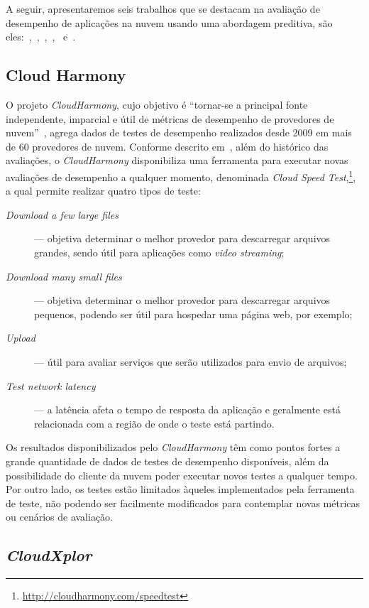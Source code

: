 A seguir, apresentaremos seis trabalhos que se destacam na avaliação de
desempenho de aplicações na nuvem usando uma abordagem preditiva, são
eles:~\cite{cloudharmony},~\cite{malkowski2010cloudxplor},~\cite{li2011},~\cite{jung2013cloudadvisor},~\cite{fittkau2012cdosim}
e~\cite{li2011cloudprophet}.

\subsection{Cloud Harmony}
O projeto {\em CloudHarmony}, cujo
objetivo é ``tornar-se a principal fonte independente, imparcial e útil de
métricas de desempenho de provedores de nuvem''~\cite{cloudharmony}, agrega
dados de testes de desempenho realizados desde 2009 em mais de 60 provedores de
nuvem. Conforme descrito em~\cite{cunha2012ambiente}, além do histórico das
avaliações, o {\em CloudHarmony} disponibiliza uma ferramenta para executar novas avaliações de desempenho a qualquer momento, denominada \textit{Cloud Speed Test},\footnote{\url{http://cloudharmony.com/speedtest}}, a qual permite realizar quatro tipos de teste:

\begin{description}
  \item[\em Download a few large files] --- objetiva determinar o melhor provedor
  para descarregar arquivos grandes, sendo útil para aplicações como {\em video
  streaming};
  \item[\em Download many small files] --- objetiva determinar o melhor provedor
  para descarregar arquivos pequenos, podendo ser útil para hospedar uma página
  web, por exemplo;
  \item[\em Upload] --- útil para avaliar serviços que serão utilizados para
  envio de arquivos;
  \item[\em Test network latency] --- a latência afeta o tempo de resposta da
  aplicação e geralmente está relacionada com a região de onde o teste está
  partindo.
\end{description}

Os resultados disponibilizados pelo {\em CloudHarmony} têm como pontos fortes a
grande quantidade de dados de testes de desempenho disponíveis, além da possibilidade do cliente da
nuvem poder executar novos testes a qualquer tempo. Por outro lado, os testes estão limitados àqueles implementados pela ferramenta de teste, não podendo ser facilmente modificados para contemplar novas métricas ou cenários de avaliação.

\subsection{{\em CloudXplor}}

